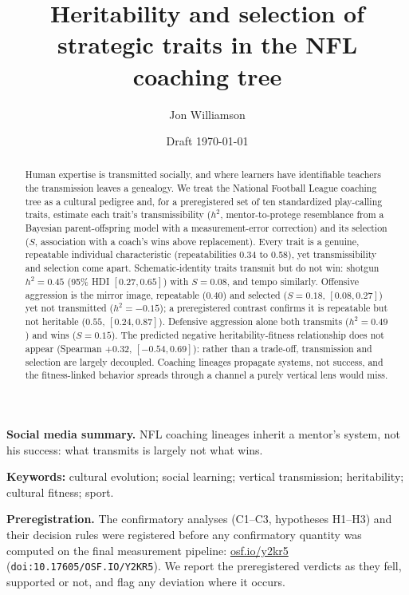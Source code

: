 \documentclass[11pt]{article}
\title{\bfseries Heritability and selection of strategic traits in the NFL coaching tree}
\author[1]{Jon Williamson}
\affil[1]{Williamson Consulting Group. Correspondence: jonwilliamson@live.com}
\date{Draft \today}
\begin{document}
\maketitle

\noindent\textbf{Social media summary.}
NFL coaching lineages inherit a mentor's system, not his success: what transmits
is largely not what wins.

\begin{abstract}
\noindent Human expertise is transmitted socially, and where learners have
identifiable teachers the transmission leaves a genealogy. We treat the National
Football League coaching tree as a cultural pedigree and, for a preregistered set
of ten standardized play-calling traits, estimate each trait's transmissibility
($h^{2}$, mentor-to-protege resemblance from a Bayesian parent-offspring model with
a measurement-error correction) and its selection ($S$, association with a coach's
wins above replacement). Every trait is a genuine, repeatable individual
characteristic (repeatabilities 0.34 to 0.58), yet transmissibility and selection
come apart. Schematic-identity traits transmit but do not win: shotgun $h^{2}=0.45$
(95\% HDI $[0.27,0.65]$) with $S=0.08$, and tempo similarly. Offensive aggression is
the mirror image, repeatable ($0.40$) and selected ($S=0.18$, $[0.08,0.27]$) yet not
transmitted ($h^{2}=-0.15$); a preregistered contrast confirms it is repeatable but
not heritable ($0.55$, $[0.24,0.87]$). Defensive aggression alone both transmits
($h^{2}=0.49$) and wins ($S=0.15$). The predicted negative heritability-fitness
relationship does not appear (Spearman $+0.32$, $[-0.54,0.69]$): rather than a
trade-off, transmission and selection are largely decoupled. Coaching lineages
propagate systems, not success, and the fitness-linked behavior spreads through a
channel a purely vertical lens would miss.
\end{abstract}

\smallskip
\noindent\textbf{Keywords:} cultural evolution; social learning; vertical
transmission; heritability; cultural fitness; sport.

\bigskip
\noindent\textbf{Preregistration.} The confirmatory analyses (C1--C3, hypotheses
H1--H3) and their decision rules were registered before any confirmatory quantity
was computed on the final measurement pipeline:
\href{https://doi.org/10.17605/OSF.IO/Y2KR5}{osf.io/y2kr5}
(\texttt{doi:10.17605/OSF.IO/Y2KR5}). We report the preregistered verdicts as they
fell, supported or not, and flag any deviation where it occurs.
\end{document}
